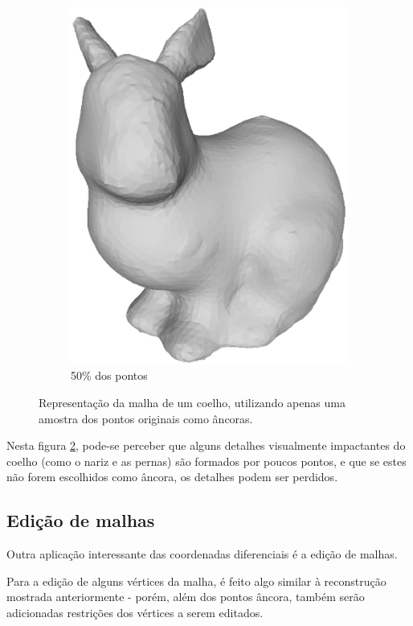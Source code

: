 \begin{figure}[H]
\begin{subfigure}[b]{0.47\textwidth}
		\includegraphics[width=\textwidth]{imagens/cap4/bunny_50.eps}
		\caption{50\% dos pontos}
		\label{fig:ex44}
	\end{subfigure}
	\caption{Representação da malha de um coelho, utilizando apenas uma amostra dos pontos originais como âncoras.}
	\label{fig:ex4rep}
\end{figure}


Nesta figura \ref{fig:ex4rep}, pode-se perceber que alguns detalhes visualmente impactantes do coelho (como o nariz e as pernas) são formados por poucos pontos, e que se estes não forem escolhidos como âncora, os detalhes podem ser perdidos.

\subsection{Edição de malhas}

Outra aplicação interessante das coordenadas diferenciais é a edição de malhas.

Para a edição de alguns vértices da malha, é feito algo similar à reconstrução mostrada anteriormente - porém, além dos pontos âncora, também serão adicionadas restrições dos vértices a serem editados.

